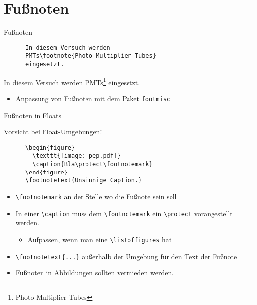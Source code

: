 \section{Fußnoten}

\begin{frame}[fragile]{Fußnoten}
  \begin{CodeExample}{0.5}
    \begin{lstlisting}
      In diesem Versuch werden
      PMTs\footnote{Photo-Multiplier-Tubes}
      eingesetzt.
    \end{lstlisting}
    \CodeResult
      In diesem Versuch werden
      PMTs\footnote{\rmfamily Photo-Multiplier-Tubes}
      eingesetzt.
    \vspace{4cm}
  \end{CodeExample}
  \begin{itemize}
    \item Anpassung von Fußnoten mit dem Paket \texttt{footmisc}
  \end{itemize}
\end{frame}

\begin{frame}[fragile]{Fußnoten in Floats}
  \begin{alertblock}{Vorsicht bei Float-Umgebungen!}
    \begin{lstlisting}
      \begin{figure}
        \texttt{[image: pep.pdf]}
        \caption{Bla\protect\footnotemark}
      \end{figure}
      \footnotetext{Unsinnige Caption.}
    \end{lstlisting}
  \end{alertblock}
  \vspace{-1pt}
  \begin{itemize}
    \item \lstinline+\footnotemark+ an der Stelle wo die Fußnote sein soll
    \item In einer \lstinline+\caption+ muss dem \lstinline+\footnotemark+ ein \lstinline+\protect+ vorangestellt werden.
      \begin{itemize}
        \item Aufpassen, wenn man eine \lstinline+\listoffigures+ hat
      \end{itemize}
    \item \lstinline+\footnotetext{...}+ außerhalb der Umgebung für den Text der Fußnote
    \item Fußnoten in Abbildungen sollten vermieden werden.
  \end{itemize}
\end{frame}
